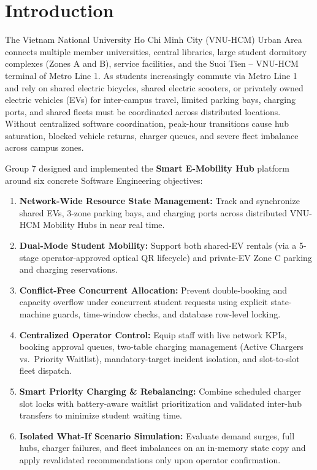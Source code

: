 \section{Introduction}
\label{sec:introduction}

\label{subsec:problem-context}
The Vietnam National University Ho Chi Minh City (VNU-HCM) Urban Area connects multiple member universities, central libraries, large student dormitory complexes (Zones A and B), service facilities, and the Suoi Tien -- VNU-HCM terminal of Metro Line 1. As students increasingly commute via Metro Line 1 and rely on shared electric bicycles, shared electric scooters, or privately owned electric vehicles (EVs) for inter-campus travel, limited parking bays, charging ports, and shared fleets must be coordinated across distributed locations. Without centralized software coordination, peak-hour transitions cause hub saturation, blocked vehicle returns, charger queues, and severe fleet imbalance across campus zones.

\label{subsec:objectives}
Group 7 designed and implemented the \textbf{Smart E-Mobility Hub} platform around six concrete Software Engineering objectives:
\begin{enumerate}
  \item \textbf{Network-Wide Resource State Management:} Track and synchronize shared EVs, 3-zone parking bays, and charging ports across distributed VNU-HCM Mobility Hubs in near real time.
  \item \textbf{Dual-Mode Student Mobility:} Support both shared-EV rentals (via a 5-stage operator-approved optical QR lifecycle) and private-EV Zone C parking and charging reservations.
  \item \textbf{Conflict-Free Concurrent Allocation:} Prevent double-booking and capacity overflow under concurrent student requests using explicit state-machine guards, time-window checks, and database row-level locking.
  \item \textbf{Centralized Operator Control:} Equip staff with live network KPIs, booking approval queues, two-table charging management (Active Chargers vs.\ Priority Waitlist), mandatory-target incident isolation, and slot-to-slot fleet dispatch.
  \item \textbf{Smart Priority Charging \& Rebalancing:} Combine scheduled charger slot locks with battery-aware waitlist prioritization and validated inter-hub transfers to minimize student waiting time.
  \item \textbf{Isolated What-If Scenario Simulation:} Evaluate demand surges, full hubs, charger failures, and fleet imbalances on an in-memory state copy and apply revalidated recommendations only upon operator confirmation.
\end{enumerate}


